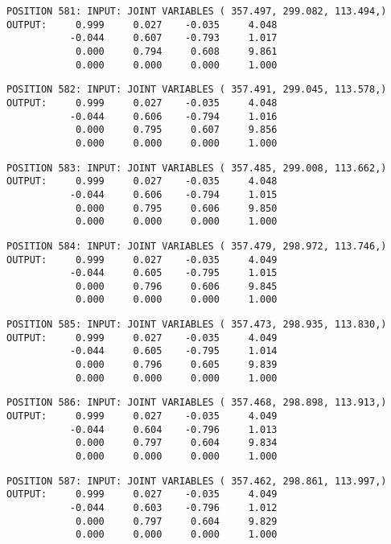 \begin{verbatim}
POSITION 581: INPUT: JOINT VARIABLES ( 357.497, 299.082, 113.494,)
OUTPUT:     0.999     0.027    -0.035     4.048
           -0.044     0.607    -0.793     1.017
            0.000     0.794     0.608     9.861
            0.000     0.000     0.000     1.000
\end{verbatim} \pagebreak[1]\begin{verbatim}
POSITION 582: INPUT: JOINT VARIABLES ( 357.491, 299.045, 113.578,)
OUTPUT:     0.999     0.027    -0.035     4.048
           -0.044     0.606    -0.794     1.016
            0.000     0.795     0.607     9.856
            0.000     0.000     0.000     1.000
\end{verbatim} \pagebreak[1]\begin{verbatim}
POSITION 583: INPUT: JOINT VARIABLES ( 357.485, 299.008, 113.662,)
OUTPUT:     0.999     0.027    -0.035     4.048
           -0.044     0.606    -0.794     1.015
            0.000     0.795     0.606     9.850
            0.000     0.000     0.000     1.000
\end{verbatim} \pagebreak[1]\begin{verbatim}
POSITION 584: INPUT: JOINT VARIABLES ( 357.479, 298.972, 113.746,)
OUTPUT:     0.999     0.027    -0.035     4.049
           -0.044     0.605    -0.795     1.015
            0.000     0.796     0.606     9.845
            0.000     0.000     0.000     1.000
\end{verbatim} \pagebreak[1]\begin{verbatim}
POSITION 585: INPUT: JOINT VARIABLES ( 357.473, 298.935, 113.830,)
OUTPUT:     0.999     0.027    -0.035     4.049
           -0.044     0.605    -0.795     1.014
            0.000     0.796     0.605     9.839
            0.000     0.000     0.000     1.000
\end{verbatim} \pagebreak[1]\begin{verbatim}
POSITION 586: INPUT: JOINT VARIABLES ( 357.468, 298.898, 113.913,)
OUTPUT:     0.999     0.027    -0.035     4.049
           -0.044     0.604    -0.796     1.013
            0.000     0.797     0.604     9.834
            0.000     0.000     0.000     1.000
\end{verbatim} \pagebreak[1]\begin{verbatim}
POSITION 587: INPUT: JOINT VARIABLES ( 357.462, 298.861, 113.997,)
OUTPUT:     0.999     0.027    -0.035     4.049
           -0.044     0.603    -0.796     1.012
            0.000     0.797     0.604     9.829
            0.000     0.000     0.000     1.000
\end{verbatim} \pagebreak[1]\begin{verbatim}

\end{verbatim}
